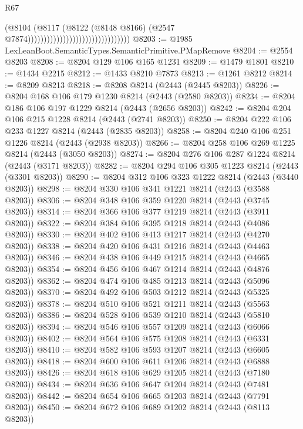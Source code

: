 \begin{lexlean}{R67}
\begin{coremodule}
                                                            (@8104
                                                              (@8117
                                                                (@8122
                                                                  (@8148 @8166)
                                                                  (@2547
                                                                    @7874))))))))))))))))))))))))))))))))
@8203 := @1985 LexLeanBoot.SemanticTypes.SemanticPrimitive.PMapRemove
@8204 := @2554 @8203
@8208 := @8204 @129 @106 @165 @1231
@8209 := @1479 @1801
@8210 := @1434 @2215
@8212 := @1433 @8210 @7873
@8213 := @1261 @8212
@8214 := @8209 @8213
@8218 := @8208 @8214 (@2443 (@2445 @8203))
@8226 := @8204 @168 @106 @179 @1230 @8214 (@2443 (@2580 @8203))
@8234 := @8204 @186 @106 @197 @1229 @8214 (@2443 (@2656 @8203))
@8242 := @8204 @204 @106 @215 @1228 @8214 (@2443 (@2741 @8203))
@8250 := @8204 @222 @106 @233 @1227 @8214 (@2443 (@2835 @8203))
@8258 := @8204 @240 @106 @251 @1226 @8214 (@2443 (@2938 @8203))
@8266 := @8204 @258 @106 @269 @1225 @8214 (@2443 (@3050 @8203))
@8274 := @8204 @276 @106 @287 @1224 @8214 (@2443 (@3171 @8203))
@8282 := @8204 @294 @106 @305 @1223 @8214 (@2443 (@3301 @8203))
@8290 := @8204 @312 @106 @323 @1222 @8214 (@2443 (@3440 @8203))
@8298 := @8204 @330 @106 @341 @1221 @8214 (@2443 (@3588 @8203))
@8306 := @8204 @348 @106 @359 @1220 @8214 (@2443 (@3745 @8203))
@8314 := @8204 @366 @106 @377 @1219 @8214 (@2443 (@3911 @8203))
@8322 := @8204 @384 @106 @395 @1218 @8214 (@2443 (@4086 @8203))
@8330 := @8204 @402 @106 @413 @1217 @8214 (@2443 (@4270 @8203))
@8338 := @8204 @420 @106 @431 @1216 @8214 (@2443 (@4463 @8203))
@8346 := @8204 @438 @106 @449 @1215 @8214 (@2443 (@4665 @8203))
@8354 := @8204 @456 @106 @467 @1214 @8214 (@2443 (@4876 @8203))
@8362 := @8204 @474 @106 @485 @1213 @8214 (@2443 (@5096 @8203))
@8370 := @8204 @492 @106 @503 @1212 @8214 (@2443 (@5325 @8203))
@8378 := @8204 @510 @106 @521 @1211 @8214 (@2443 (@5563 @8203))
@8386 := @8204 @528 @106 @539 @1210 @8214 (@2443 (@5810 @8203))
@8394 := @8204 @546 @106 @557 @1209 @8214 (@2443 (@6066 @8203))
@8402 := @8204 @564 @106 @575 @1208 @8214 (@2443 (@6331 @8203))
@8410 := @8204 @582 @106 @593 @1207 @8214 (@2443 (@6605 @8203))
@8418 := @8204 @600 @106 @611 @1206 @8214 (@2443 (@6888 @8203))
@8426 := @8204 @618 @106 @629 @1205 @8214 (@2443 (@7180 @8203))
@8434 := @8204 @636 @106 @647 @1204 @8214 (@2443 (@7481 @8203))
@8442 := @8204 @654 @106 @665 @1203 @8214 (@2443 (@7791 @8203))
@8450 := @8204 @672 @106 @689 @1202 @8214 (@2443 (@8113 @8203))

\end{coremodule}
\end{lexlean}

